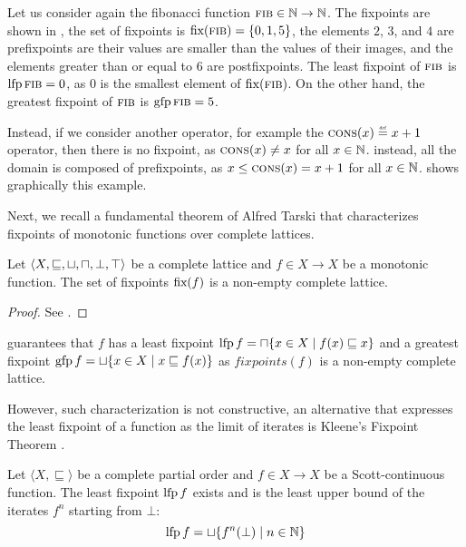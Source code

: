 \begin{example}
  Let us consider again the fibonacci function $\textsc{fib} \in \mathbb{N} \to \mathbb{N}$. The fixpoints are shown in , the set of fixpoints is $\textup{fix}(\textsc{fib}) = \{0, 1, 5\}$, the elements $2$, $3$, and $4$ are prefixpoints are their values are smaller than the values of their images, and the elements greater than or equal to $6$ are postfixpoints.
  The least fixpoint of $\textsc{fib}$ is $\operatorname{lfp} \textsc{fib} = 0$, as $0$ is the smallest element of $\textup{fix}(\textsc{fib})$.
  On the other hand, the greatest fixpoint of $\textsc{fib}$ is $\operatorname{gfp} \textsc{fib} = 5$.

  Instead, if we consider another operator, for example the $\textsc{cons}(x) \defeq x + 1$ operator, then there is no fixpoint, as $\textsc{cons}(x) \neq x$ for all $x \in \mathbb{N}$. instead, all the domain is composed of prefixpoints, as $x \le \textsc{cons}(x) = x + 1$ for all $x \in \mathbb{N}$.  shows graphically this example.
\end{example}

Next, we recall a fundamental theorem of Alfred Tarski  that characterizes fixpoints of monotonic functions over complete lattices.

\begin{theorem}
  Let $\langle X, \sqsubseteq, \sqcup, \sqcap, \bot, \top \rangle$ be a complete lattice and $f \in X \to X$ be a monotonic function. The set of fixpoints $\textup{fix}(f)$ is a non-empty complete lattice.
\end{theorem}
\begin{proof}
  See \textcite{Tarski1955}.
\end{proof}
 guarantees that $f$ has a least fixpoint $\operatorname{lfp} f = \sqcap \{x \in X \mid f(x) \sqsubseteq x\}$ and a greatest fixpoint $\operatorname{gfp} f = \sqcup \{x \in X \mid x \sqsubseteq f(x)\}$ as $fixpoints(f)$ is a non-empty complete lattice.

However, such characterization is not constructive, an alternative that expresses the least fixpoint of a function as the limit of iterates is Kleene's Fixpoint Theorem .


\begin{theorem}
  Let $\langle X, \sqsubseteq \rangle$ be a complete partial order and $f \in X \to X$ be a Scott-continuous function. The least fixpoint $\operatorname{lfp} f$ exists and is the least upper bound of the iterates $f^n$ starting from $\bot$:
  \[ \operatorname{lfp} f = \sqcup \{f^n(\bot) \mid n \in \mathbb{N}\} \]
\end{theorem}

